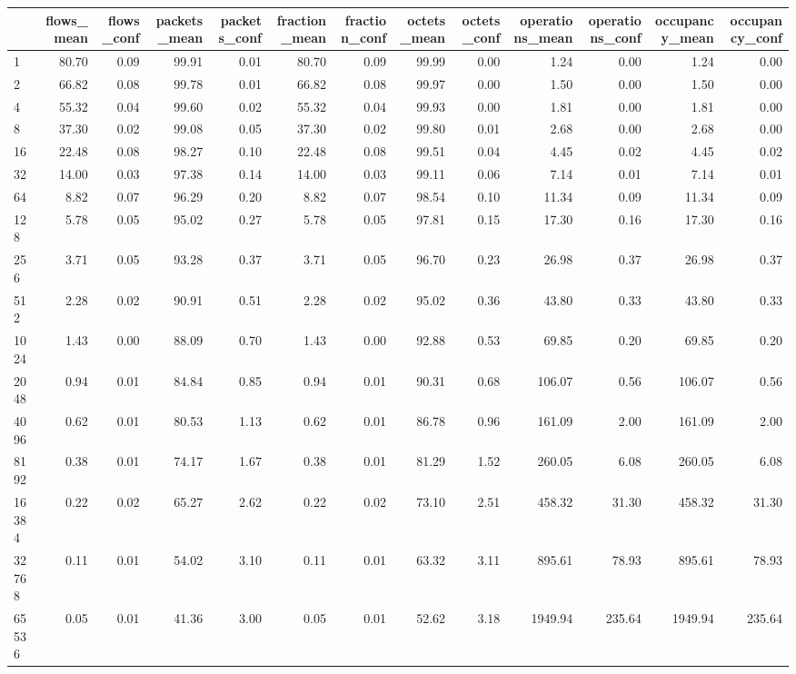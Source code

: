 \begin{tabular}{lrrrrrrrrrrrr}
\toprule
 & flows_mean & flows_conf & packets_mean & packets_conf & fraction_mean & fraction_conf & octets_mean & octets_conf & operations_mean & operations_conf & occupancy_mean & occupancy_conf \\
\midrule
1 & 80.70 & 0.09 & 99.91 & 0.01 & 80.70 & 0.09 & 99.99 & 0.00 & 1.24 & 0.00 & 1.24 & 0.00 \\
2 & 66.82 & 0.08 & 99.78 & 0.01 & 66.82 & 0.08 & 99.97 & 0.00 & 1.50 & 0.00 & 1.50 & 0.00 \\
4 & 55.32 & 0.04 & 99.60 & 0.02 & 55.32 & 0.04 & 99.93 & 0.00 & 1.81 & 0.00 & 1.81 & 0.00 \\
8 & 37.30 & 0.02 & 99.08 & 0.05 & 37.30 & 0.02 & 99.80 & 0.01 & 2.68 & 0.00 & 2.68 & 0.00 \\
16 & 22.48 & 0.08 & 98.27 & 0.10 & 22.48 & 0.08 & 99.51 & 0.04 & 4.45 & 0.02 & 4.45 & 0.02 \\
32 & 14.00 & 0.03 & 97.38 & 0.14 & 14.00 & 0.03 & 99.11 & 0.06 & 7.14 & 0.01 & 7.14 & 0.01 \\
64 & 8.82 & 0.07 & 96.29 & 0.20 & 8.82 & 0.07 & 98.54 & 0.10 & 11.34 & 0.09 & 11.34 & 0.09 \\
128 & 5.78 & 0.05 & 95.02 & 0.27 & 5.78 & 0.05 & 97.81 & 0.15 & 17.30 & 0.16 & 17.30 & 0.16 \\
256 & 3.71 & 0.05 & 93.28 & 0.37 & 3.71 & 0.05 & 96.70 & 0.23 & 26.98 & 0.37 & 26.98 & 0.37 \\
512 & 2.28 & 0.02 & 90.91 & 0.51 & 2.28 & 0.02 & 95.02 & 0.36 & 43.80 & 0.33 & 43.80 & 0.33 \\
1024 & 1.43 & 0.00 & 88.09 & 0.70 & 1.43 & 0.00 & 92.88 & 0.53 & 69.85 & 0.20 & 69.85 & 0.20 \\
2048 & 0.94 & 0.01 & 84.84 & 0.85 & 0.94 & 0.01 & 90.31 & 0.68 & 106.07 & 0.56 & 106.07 & 0.56 \\
4096 & 0.62 & 0.01 & 80.53 & 1.13 & 0.62 & 0.01 & 86.78 & 0.96 & 161.09 & 2.00 & 161.09 & 2.00 \\
8192 & 0.38 & 0.01 & 74.17 & 1.67 & 0.38 & 0.01 & 81.29 & 1.52 & 260.05 & 6.08 & 260.05 & 6.08 \\
16384 & 0.22 & 0.02 & 65.27 & 2.62 & 0.22 & 0.02 & 73.10 & 2.51 & 458.32 & 31.30 & 458.32 & 31.30 \\
32768 & 0.11 & 0.01 & 54.02 & 3.10 & 0.11 & 0.01 & 63.32 & 3.11 & 895.61 & 78.93 & 895.61 & 78.93 \\
65536 & 0.05 & 0.01 & 41.36 & 3.00 & 0.05 & 0.01 & 52.62 & 3.18 & 1949.94 & 235.64 & 1949.94 & 235.64 \\

\end{tabular}
